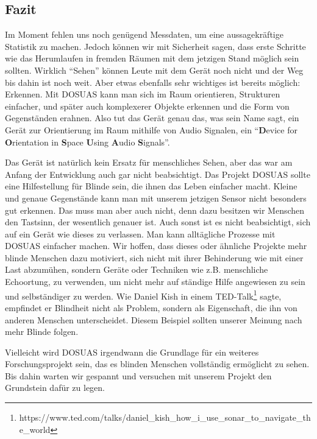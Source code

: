 \documentclass[a4paper,12pt,ngerman]{scrartcl}
\begin{document}
\subsection{Fazit}

Im Moment fehlen uns noch genügend Messdaten, um eine aussagekräftige Statistik zu machen. Jedoch
können wir mit Sicherheit sagen, dass erste Schritte wie das Herumlaufen in fremden Räumen mit
dem jetzigen Stand möglich sein sollten. Wirklich \enquote{Sehen} können Leute mit dem Gerät
noch nicht und der Weg bis dahin ist noch weit. Aber etwas ebenfalls sehr wichtiges
ist bereits möglich: Erkennen. Mit DOSUAS kann man sich im Raum orientieren, Strukturen einfacher, und später auch komplexerer Objekte erkennen und die Form von Gegenständen erahnen. Also tut das Gerät genau das, was sein Name sagt,  ein Gerät zur Orientierung im Raum mithilfe von Audio
Signalen, ein \enquote{\textbf{D}evice for \textbf{O}rientation in \textbf{S}pace \textbf{U}sing 
	\textbf{A}udio \textbf{S}ignals}.\par 
Das Gerät ist natürlich kein Ersatz für menschliches Sehen, aber das war am Anfang der Entwicklung
auch gar nicht beabsichtigt. Das Projekt DOSUAS sollte eine Hilfestellung für Blinde sein, die ihnen das Leben einfacher macht. Kleine und genaue Gegenstände kann man mit unserem jetzigen Sensor nicht besonders gut erkennen. Das muss man aber auch nicht, denn dazu besitzen wir Menschen den Tastsinn, der wesentlich genauer ist. Auch sonst ist es nicht beabsichtigt, sich auf 
ein Gerät wie dieses zu verlassen. Man kann alltägliche Prozesse mit DOSUAS einfacher machen. 
Wir hoffen, dass dieses oder ähnliche Projekte mehr blinde Menschen dazu motiviert, sich nicht 
mit ihrer Behinderung wie mit einer Last abzumühen, sondern Geräte oder Techniken
wie z.B. menschliche Echoortung, zu verwenden, um nicht mehr auf ständige Hilfe angewiesen 
zu sein und selbständiger zu werden. Wie Daniel Kish in einem TED-Talk\footnote{https://www.ted.com/talks/daniel\_kish\_how\_i\_use\_sonar\_to\_navigate\_the\_world} sagte, 
empfindet er Blindheit nicht als Problem, sondern als Eigenschaft, die ihn von anderen Menschen
unterscheidet. Diesem Beispiel sollten unserer Meinung nach mehr Blinde folgen.\par 
Vielleicht wird DOSUAS irgendwann die Grundlage für ein weiteres
Forschungsprojekt sein, das es blinden Menschen vollständig ermöglicht zu sehen. Bis dahin
warten wir gespannt und versuchen mit unserem Projekt den Grundstein dafür zu legen. 

\newpage
\end{document}
